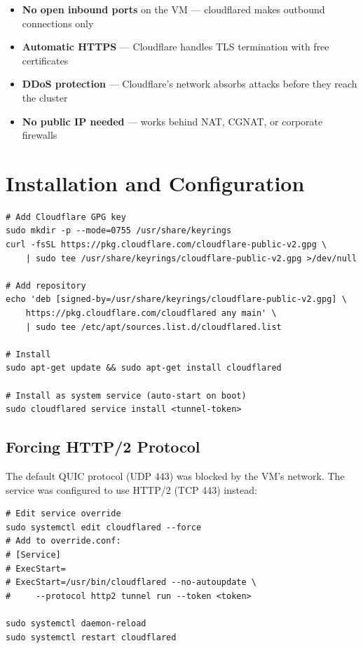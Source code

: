 \documentclass[12pt,a4paper]{report}
\begin{document}
\begin{infobox}
\begin{itemize}
  \item \textbf{No open inbound ports} on the VM --- cloudflared makes outbound connections only
  \item \textbf{Automatic HTTPS} --- Cloudflare handles TLS termination with free certificates
  \item \textbf{DDoS protection} --- Cloudflare's network absorbs attacks before they reach the cluster
  \item \textbf{No public IP needed} --- works behind NAT, CGNAT, or corporate firewalls
\end{itemize}
\end{infobox}

\section{Installation and Configuration}

\begin{lstlisting}[style=bashstyle, caption={cloudflared Installation on Worker1}]
# Add Cloudflare GPG key
sudo mkdir -p --mode=0755 /usr/share/keyrings
curl -fsSL https://pkg.cloudflare.com/cloudflare-public-v2.gpg \
    | sudo tee /usr/share/keyrings/cloudflare-public-v2.gpg >/dev/null

# Add repository
echo 'deb [signed-by=/usr/share/keyrings/cloudflare-public-v2.gpg] \
    https://pkg.cloudflare.com/cloudflared any main' \
    | sudo tee /etc/apt/sources.list.d/cloudflared.list

# Install
sudo apt-get update && sudo apt-get install cloudflared

# Install as system service (auto-start on boot)
sudo cloudflared service install <tunnel-token>
\end{lstlisting}

\subsection{Forcing HTTP/2 Protocol}

The default QUIC protocol (UDP 443) was blocked by the VM's network. The service was configured to use HTTP/2 (TCP 443) instead:

\begin{lstlisting}[style=bashstyle, caption={Override Service to Use HTTP/2}]
# Edit service override
sudo systemctl edit cloudflared --force
# Add to override.conf:
# [Service]
# ExecStart=
# ExecStart=/usr/bin/cloudflared --no-autoupdate \
#     --protocol http2 tunnel run --token <token>

sudo systemctl daemon-reload
sudo systemctl restart cloudflared
\end{lstlisting}
\end{document}
